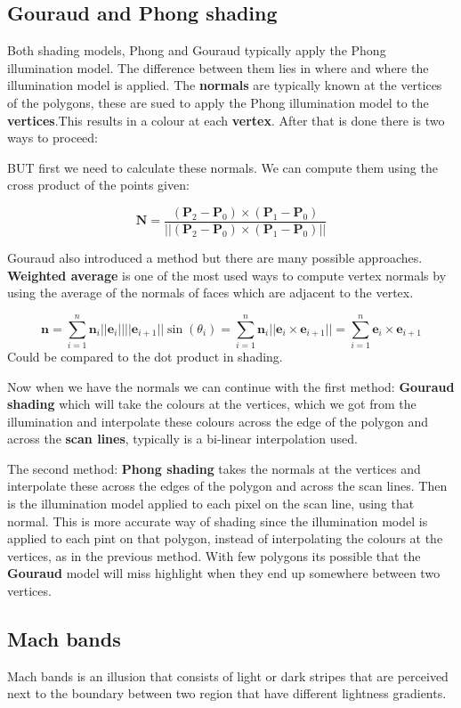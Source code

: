 	\subsection*{Gouraud and Phong shading}
	Both shading models, Phong and Gouraud typically apply the Phong illumination model. The difference between them lies in where and where the illumination model is applied. The \textbf{normals} are typically known at the vertices of the polygons, these are sued to apply the Phong illumination model to the \textbf{vertices}.This results in a colour at each \textbf{vertex}. After that is done there is two ways to proceed: 

	BUT first we need to calculate these normals. We can compute them using the cross product of the points given:

		\begin{equation}
			\textbf{N} = \frac{(\textbf{P}_2 - \textbf{P}_0) \times (\textbf{P}_1 - \textbf{P}_0)} {||(\textbf{P}_2 - \textbf{P}_0) \times (\textbf{P}_1 - \textbf{P}_0)||} 		
		\end{equation}

	Gouraud also introduced a method but there are many possible approaches. \textbf{Weighted average} is one of the most used ways to compute vertex normals by using the average of the normals of faces which are adjacent to the vertex.

		\begin{equation}
			\textbf{n} = \sum_{i=1}^{n} \textbf{n}_i ||\textbf{e}_i||||\textbf{e}_{i+1}||\sin(\theta_i) = \sum_{i=1}^{n} \textbf{n}_i ||\textbf{e}_i \times \textbf{e}_{i+1}|| = \sum_{i=1}^{n} \textbf{e}_i \times \textbf{e}_{i+1}
		\end{equation}
	Could be compared to the dot product in shading. 

	Now when we have the normals we can continue with the first method: \textbf{Gouraud shading} which will take the colours at the vertices, which we got from the illumination and interpolate these colours across the edge of the polygon and across the \textbf{scan lines}, typically is a bi-linear interpolation used. 

	The second method: \textbf{Phong shading} takes the normals at the vertices and interpolate these across the edges of the polygon and across the scan lines. Then is the illumination model applied to each pixel on the scan line, using that normal. This is more accurate way of shading since the illumination model is applied to each pint on that polygon, instead of interpolating the colours at the vertices, as in the previous method. With few polygons its possible that the \textbf{Gouraud} model will miss highlight when they end up somewhere between two vertices. 

	\subsection*{Mach bands}
	Mach bands is an illusion that consists of light or dark stripes that are perceived next to the boundary between two region that have different lightness gradients. 














